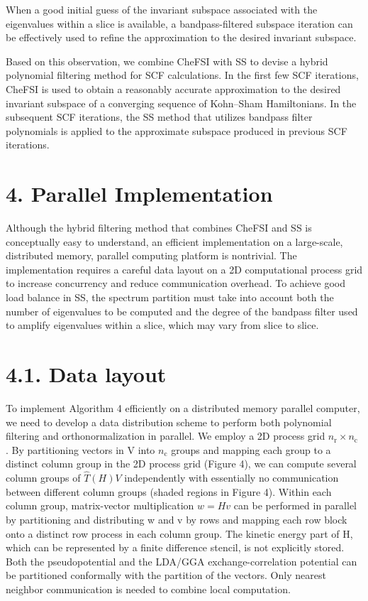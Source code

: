 \documentclass[
  10
]{article}
\begin{document}
When a good initial guess of the invariant subspace associated with the
eigenvalues within a slice is available, a bandpass-filtered subspace
iteration can be effectively used to refine the approximation to the
desired invariant subspace.

Based on this observation, we combine CheFSI with SS to devise a hybrid
polynomial filtering method for SCF calculations. In the first few SCF
iterations, CheFSI is used to obtain a reasonably accurate approximation
to the desired invariant subspace of a converging sequence of Kohn--Sham
Hamiltonians. In the subsequent SCF iterations, the SS method that
utilizes bandpass filter polynomials is applied to the approximate
subspace produced in previous SCF iterations.

\section{4. Parallel Implementation}\label{parallel-implementation}

Although the hybrid filtering method that combines CheFSI and SS is
conceptually easy to understand, an efficient implementation on a
large-scale, distributed memory, parallel computing platform is
nontrivial. The implementation requires a careful data layout on a 2D
computational process grid to increase concurrency and reduce
communication overhead. To achieve good load balance in SS, the spectrum
partition must take into account both the number of eigenvalues to be
computed and the degree of the bandpass filter used to amplify
eigenvalues within a slice, which may vary from slice to slice.

\section{4.1. Data layout}\label{data-layout}

To implement Algorithm 4 efficiently on a distributed memory parallel
computer, we need to develop a data distribution scheme to perform both
polynomial filtering and orthonormalization in parallel. We employ a 2D
process grid \(n _ { \mathrm { r } } \times n _ { \mathrm { c } }\) . By
partitioning vectors in V into \(n _ { \mathrm { c } }\) groups and
mapping each group to a distinct column group in the 2D process grid
(Figure 4), we can compute several column groups of
\({ \hat { T } } ( H ) V\) independently with essentially no
communication between different column groups (shaded regions in Figure
4). Within each column group, matrix-vector multiplication \(w = H v\)
can be performed in parallel by partitioning and distributing w and v by
rows and mapping each row block onto a distinct row process in each
column group. The kinetic energy part of H, which can be represented by
a finite difference stencil, is not explicitly stored. Both the
pseudopotential and the LDA/GGA exchange-correlation potential can be
partitioned conformally with the partition of the vectors. Only nearest
neighbor communication is needed to combine local computation.
\end{document}
